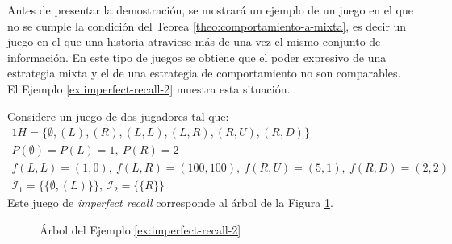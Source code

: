 Antes de presentar la demostración, se mostrará un ejemplo de un juego en el que no se cumple la condición del Teorea \ref{theo:comportamiento-a-mixta}, es decir un juego en el que una historia atraviese más de una vez el mismo conjunto de información. En este tipo de juegos se obtiene que el poder expresivo de una estrategia mixta y el de una estrategia de comportamiento no son comparables. El Ejemplo \ref{ex:imperfect-recall-2} \cite[p.~44]{bib:handbook-blai} muestra esta situación.

\begin{example}
\label{ex:imperfect-recall-2}
Considere un juego de dos jugadores tal que:
\begin{alignat}{1}
H = \{ \emptyset, (L), (R), (L,L), (L,R), (R, U), (R, D)\} \\
 P(\emptyset) = P(L) = 1, \ P(R) = 2 \\
 f(L, L) = (1, 0), \ f(L, R) = (100, 100), \ f(R, U) = (5, 1), \ f(R, D) = (2, 2) \\
\mathcal{I}_1 = \{ \{ \emptyset, (L)\} \}, \ \mathcal{I}_2 = \{ \{ R \} \}
\end{alignat}
Este juego de \textit{imperfect
recall} corresponde al árbol de la Figura \ref{fig:imperfect-recall-2}.
\end{example}

\begin{figure}[ht]
\begin{center}
\caption{Árbol del Ejemplo \ref{ex:imperfect-recall-2}}
\label{fig:imperfect-recall-2}
\end{center}
\end{figure}

